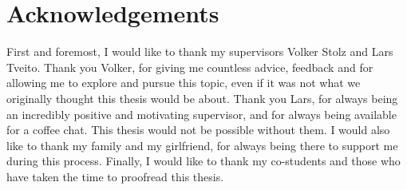 \chapter*{Acknowledgements}

First and foremost, I would like to thank my supervisors Volker Stolz and Lars Tveito.
Thank you Volker, for giving me countless advice, feedback and for allowing me to explore
and pursue this topic, even if it was not what we originally thought this thesis would be
about. Thank you Lars, for always being an incredibly positive and motivating supervisor,
and for always being available for a coffee chat. This thesis would not be possible
without them. I would also like to thank my family and my girlfriend, for always being
there to support me during this process. Finally, I would like to thank my co-students and
those who have taken the time to proofread this thesis.
